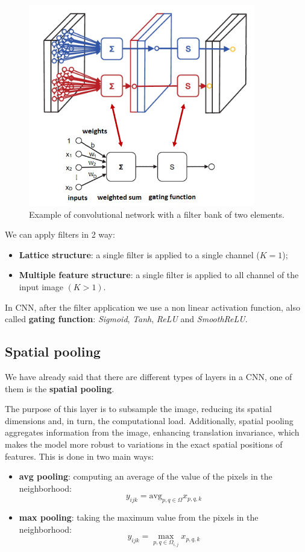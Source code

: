 \begin{figure}[!ht]
    \centering
    \includegraphics[width=0.25\linewidth]{img/CNN/Conv2Filter.png}
    \caption{Example of convolutional network with a filter bank of two elements.}
    \label{fig:conv2filter}
\end{figure}

We can apply filters in 2 way:
\begin{itemize}
    \item \textbf{Lattice structure}: a single filter is applied to a single
          channel ($K = 1$);
    \item \textbf{Multiple feature structure}: a single filter is applied to all
          channel of the input image $(K > 1)$.
\end{itemize}

In CNN, after the filter application we use a non linear activation function,
also called \textbf{gating function}: \textit{Sigmoid}, \textit{Tanh}, \textit{ReLU}
and \textit{SmoothReLU}.

\subsection{Spatial pooling}
We have already said that there are different types of layers in a CNN, one of
them is the \textbf{spatial pooling}.

The purpose of this layer is to subsample the image, reducing its spatial
dimensions and, in turn, the computational load. Additionally, spatial pooling
aggregates information from the image, enhancing translation invariance, which
makes the model more robust to variations in the exact spatial positions of
features. This is done in two main ways:
\begin{itemize}
    \item \textbf{avg pooling}: computing an average of the value of the pixels
          in the neighborhood:
          \begin{equation}
              y_{ijk} =\text{avg}_{p, q \in \Omega} x_{p, q, k}
          \end{equation}
    \item \textbf{max pooling}: taking the maximum value from the pixels in the
          neighborhood:
          \begin{equation}
              y_{ijk} = \max_{p, q \in \Omega_{i, j}} x_{p, q, k}
          \end{equation}
\end{itemize}

